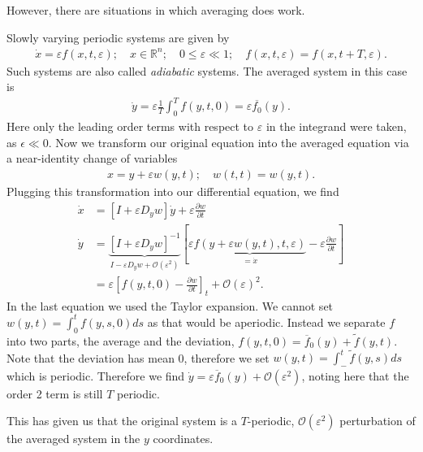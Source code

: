 However, there are situations in which averaging does work.
\begin{ex}
Slowly varying periodic systems are given by
\begin{align}
	\dot{x} = \varepsilon f(x, t, \varepsilon);\quad x \in \mathbb{R}^{n};\quad 0 \leq \varepsilon \ll 1;\quad f(x,t,\varepsilon) = f(x,t+T,\varepsilon).
\end{align}
Such systems are also called \emph{adiabatic} systems.
The averaged system in this case is
\begin{align}
	\dot{y} = \varepsilon \frac{1}{T} \int_{0}^{T} f(y,t,0) = \varepsilon \overline{f_0}(y).	
\end{align}
Here only the leading order terms with respect to $\varepsilon$ in the integrand were taken, as $\epsilon \ll 0$. Now we transform our original equation into the averaged equation via a near-identity change of variables
\begin{align}
	x=y+\varepsilon w(y,t);\quad w(t,t) = w(y, t).
\end{align}
Plugging this transformation into our differential equation, we find
\begin{align}
	\dot{x} &= \left[ I + \varepsilon D_{y}w\right]\dot{y} + \varepsilon \frac{\partial w}{\partial t} \\
	\dot{y} & = \underbrace{\left[ I + \varepsilon D_{y}w \right] ^{-1}}_{I - \varepsilon D_yw + \mathcal{O}(\varepsilon^2)}
	\left[\varepsilon  \underbrace{f(y+\varepsilon w(y,t),t,\varepsilon)}_{=\dot{x}} -\varepsilon \frac{\partial w}{\partial t} \right]\\ 
		&=\varepsilon \left[f(y,t,0) - \frac{\partial w}{\partial t}\right]_{t} + \mathcal{O}(\varepsilon)^2.
\end{align}
In the last equation we used the Taylor expansion. We cannot set $w(y,t) = \int_{0}^{t} f(y,s,0)ds$ as that would be aperiodic. Instead we separate $f$ into two parts, the average and the deviation, $f(y,t,0) = \overline{f}_0 (y) + \tilde{f}(y,t)$. Note that the deviation has mean 0, therefore we set $w(y,t) = \int_{-}^{t} \tilde{f}(y,s)ds$ which is periodic. Therefore we find $\dot{y} = \varepsilon \overline{f}_0(y) + \mathcal{O}(\varepsilon^2)$, noting here that the order 2 term is still $T$ periodic. 

This has given us that the original system is a $T$-periodic, $\mathcal{O}(\varepsilon^2)$ perturbation of the averaged system in the $y$ coordinates. 
\end{ex}

